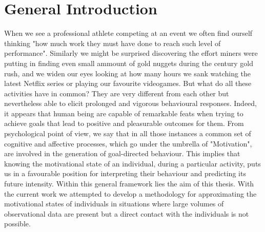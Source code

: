 \section{General Introduction}
When we see a professional athlete competing at an event we often find ourself thinking "how much work they must have done to reach such level of performance". Similarly we might be surprised discovering the effort miners were putting in finding even small ammount of gold nuggets during the  century gold rush, and we widen our eyes looking at how many hours we sank watching the latest Netflix series or playing our favourite videogames. But what do all these activities have in common? They are very different from each other but nevertheless able to elicit prolonged and vigorous behavioural responses. Indeed, it appears that human being are capable of remarkable feats when trying to achieve goals that lead to positive and pleasurable outcomes for them. From psychological point of view, we say that in all those instances a common set of cognitive and affective processes, which go under the umbrella of "Motivation", are involved in the generation of goal-directed behaviour. This implies that knowing the motivational state of an individual, during a particular activity, puts us in a favourable position for interpreting their behaviour and predicting its future intensity. Within this general framework lies the aim of this thesis. With the current work we attempted to develop a methodology for approximating the motivational states of individuals in situations where large volumes of observational data are present but a direct contact with the individuals is not possible.


